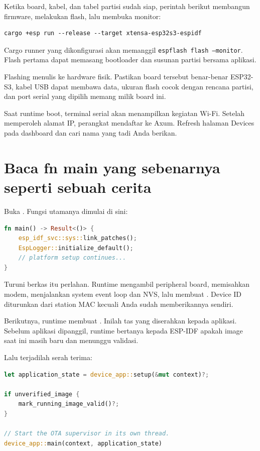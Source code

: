 Ketika board, kabel, dan tabel partisi sudah siap, perintah berikut membangun firmware, melakukan flash, lalu membuka monitor:

\begin{lstlisting}
cargo +esp run --release --target xtensa-esp32s3-espidf
\end{lstlisting}

Cargo runner yang dikonfigurasi akan memanggil \texttt{espflash flash --monitor}. Flash pertama dapat memasang bootloader dan susunan partisi bersama aplikasi.

\begin{warningbox}
Flashing menulis ke hardware fisik. Pastikan board tersebut benar-benar ESP32-S3, kabel USB dapat membawa data, ukuran flash cocok dengan rencana partisi, dan port serial yang dipilih memang milik board ini.
\end{warningbox}

Saat runtime boot, terminal serial akan menampilkan kegiatan Wi-Fi. Setelah memperoleh alamat IP, perangkat mendaftar ke Axum. Refresh halaman Devices pada dashboard dan cari nama yang tadi Anda berikan.

\section{Baca fn main yang sebenarnya seperti sebuah cerita}

Buka . Fungsi utamanya dimulai di sini:

\begin{lstlisting}[language=Rust,numbers=none]
fn main() -> Result<()> {
    esp_idf_svc::sys::link_patches();
    EspLogger::initialize_default();
    // platform setup continues...
}
\end{lstlisting}

Turuni berkas itu perlahan. Runtime mengambil peripheral board, memisahkan modem, menjalankan system event loop dan NVS, lalu membuat . Device ID diturunkan dari station MAC kecuali Anda sudah memberikannya sendiri.

Berikutnya, runtime membuat . Inilah tas yang diserahkan kepada aplikasi. Sebelum aplikasi dipanggil, runtime bertanya kepada ESP-IDF apakah image saat ini masih baru dan menunggu validasi.

Lalu terjadilah serah terima:

\begin{lstlisting}[language=Rust]
let application_state = device_app::setup(&mut context)?;

if unverified_image {
    mark_running_image_valid()?;
}

// Start the OTA supervisor in its own thread.
device_app::main(context, application_state)
\end{lstlisting}


